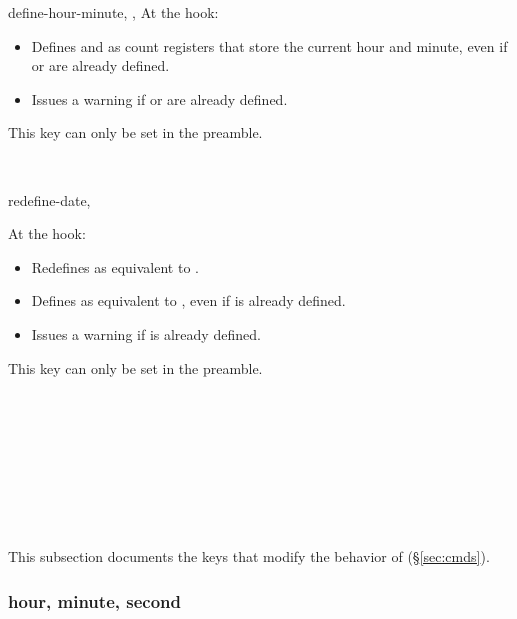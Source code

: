 \documentclass{beerydoc}
\begin{document}
\begin{codedoc}{define-hour-minute, \hour, \minute}
  At the  hook:
  \begin{itemize}
    \item
    Defines  and  as count registers that store the current
    hour and minute, even if  or  are already defined.
    \item Issues a warning if  or  are already defined.
  \end{itemize}
  This key can only be set in the preamble.
  \begin{codedemo}
    \clock{\hour}\\
    \clock{\hour:\minute}
  \end{codedemo}
\end{codedoc}

\begin{codedoc}{redefine-date, \date, \Date}
  At the  hook:
  \begin{itemize}
    \item Redefines  as equivalent to .
    \item
    Defines  as equivalent to , even if  is
    already defined.
    \item Issues a warning if  is already defined.
  \end{itemize}
  This key can only be set in the preamble.
  \begin{codedemo}
    \\
    \\
    \\
    \date{1920-8-26}\\
    \date{8-26}\\
    \date{1920-8}
  \end{codedemo}
\end{codedoc}

\subsection{}
\label{subsec:clock}

This subsection documents the keys that modify the behavior of 
(\S\ref{sec:cmds}).

\subsubsection{hour, minute, second}
\label{subsubsec:hms}
\end{document}
